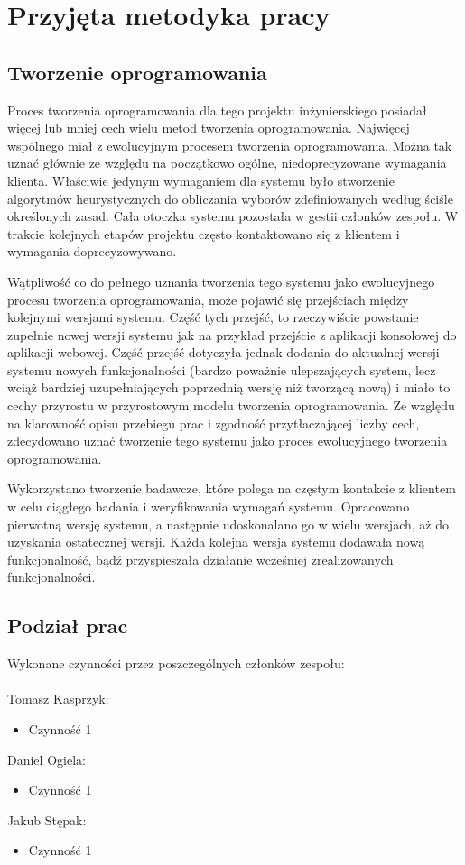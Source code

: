 \documentclass[pdflatex,11pt]{../aghdoc_version2}
\newlength\tindent
\renewcommand{\indent}{\hspace*{\tindent}}
\begin{document}
\chapter{Przyjęta metodyka pracy}
\section{Tworzenie oprogramowania}
Proces tworzenia oprogramowania dla tego projektu inżynierskiego posiadał więcej lub mniej
cech wielu metod tworzenia oprogramowania. Najwięcej wspólnego miał z ewolucyjnym
procesem tworzenia oprogramowania. Można tak uznać głównie ze względu na początkowo
ogólne, niedoprecyzowane wymagania klienta. Właściwie jedynym wymaganiem dla
systemu było stworzenie algorytmów heurystycznych do obliczania wyborów zdefiniowanych
według ściśle określonych zasad. Cała otoczka systemu pozostała w gestii członków
zespołu. W trakcie kolejnych etapów projektu często kontaktowano się z klientem i
wymagania doprecyzowywano. 

\indent Wątpliwość co do pełnego uznania tworzenia tego systemu
jako ewolucyjnego procesu tworzenia oprogramowania, może pojawić się przejściach
między kolejnymi wersjami systemu. Część tych przejść, to rzeczywiście powstanie zupełnie
nowej wersji systemu jak na przykład przejście z aplikacji konsolowej do aplikacji webowej.
Część przejść dotyczyła jednak dodania do aktualnej wersji systemu nowych funkcjonalności
(bardzo poważnie ulepszających system, lecz wciąż bardziej uzupełniających poprzednią
wersję niż tworzącą nową) i miało to cechy przyrostu w przyrostowym modelu tworzenia
oprogramowania. Ze względu na klarowność opisu przebiegu prac i zgodność
przytłaczającej liczby cech, zdecydowano uznać tworzenie tego systemu jako proces
ewolucyjnego tworzenia oprogramowania.

\indent Wykorzystano tworzenie badawcze, które polega na częstym kontakcie z klientem w celu
ciągłego badania i weryfikowania wymagań systemu. Opracowano pierwotną wersję
systemu, a następnie udoskonalano go w wielu wersjach, aż do uzyskania ostatecznej
wersji. Każda kolejna wersja systemu dodawała nową funkcjonalność, bądź przyspieszała
działanie wcześniej zrealizowanych funkcjonalności.

\section{Podział prac}
Wykonane czynności przez poszczególnych członków zespołu: \\ \\
Tomasz Kasprzyk:
\begin{itemize}
\item Czynność 1
\end{itemize}
Daniel Ogiela:
\begin{itemize}
\item Czynność 1
\end{itemize}
Jakub Stępak:
\begin{itemize}
\item Czynność 1
\end{itemize}
\end{document}
